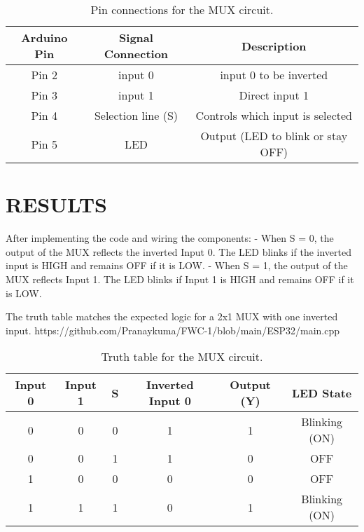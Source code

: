 \documentclass[conference]{IEEEtran}
\begin{document}
 \begin{table}[htbp]                                       
\centering                                                          
\begin{tabular}{| c | c | c |} \hline                                
\textbf{Arduino Pin} & \textbf{Signal Connection} & \textbf{Description} \\\hline 
Pin 2 & input 0 & input 0 to be inverted \\ \hline                     
Pin 3 & input 1 & Direct input 1\\ \hline                                 
Pin 4 & Selection line (S) & Controls which input is selected \\ \hline    
Pin 5 & LED & Output (LED to blink or stay OFF) \\ \hline                                                                                  
\end{tabular}                                                        
\vspace{0.1cm}                                                       
\caption{\label{tab:connections} Pin connections for the MUX circuit.}                                       
\end{table}

\section{RESULTS}
After implementing the code and wiring the components:  
- When S = 0, the output of the MUX reflects the inverted Input 0. The LED blinks if the inverted input is HIGH and remains OFF if it is LOW.  
- When S = 1, the output of the MUX reflects Input 1. The LED blinks if Input 1 is HIGH and remains OFF if it is LOW.  

The truth table matches the expected logic for a 2x1 MUX with one inverted input.  
https://github.com/Pranaykuma/FWC-1/blob/main/ESP32/main.cpp 
 \begin{table}[htbp]                                       
\centering                                                          
\begin{tabular}{| c | c | c | c | c | c |} \hline                                
\textbf{Input 0} & \textbf{Input 1} & \textbf{S} & \textbf{Inverted Input 0} & \textbf{Output (Y)} & \textbf{LED State}\\\hline 
0 & 0 & 0 & 1 & 1 & Blinking (ON) \\ \hline                     
0 & 0 & 1 & 1 & 0 & OFF  \\ \hline                                 
1 & 0 & 0 & 0 & 0 & OFF  \\ \hline    
1 & 1 & 1 & 0 & 1 & Blinking (ON)  \\ \hline                                                                           
\end{tabular}                                                        
\vspace{0.1cm}                                                       
\caption{\label{tab:truth} Truth table for the MUX circuit.}                                       
\end{table}
\end{document}
